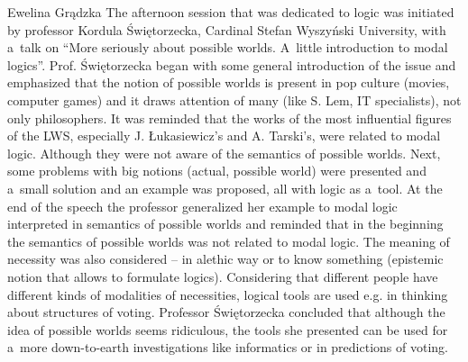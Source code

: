 \begin{editorialeng}{Ewelina Grądzka}
The afternoon session that was dedicated to logic was initiated by professor Kordula Świętorzecka, Cardinal Stefan Wyszyński University, with a~talk on “More seriously about possible worlds. A~little introduction to modal logics”. Prof. Świętorzecka began with some general introduction of the issue and emphasized that the notion of possible worlds is present in pop culture (movies, computer games) and it draws attention of many (like S. Lem, IT specialists), not only philosophers. It was reminded that the works of the most influential figures of the LWS, especially J. Łukasiewicz’s and A. Tarski’s, were related to modal logic. Although they were not aware of the semantics of possible worlds. Next, some problems with big notions (actual, possible world) were presented and a~small solution and an example was proposed, all with logic as a~tool. At the end of the speech the professor generalized her example to modal logic interpreted in semantics of possible worlds and reminded that in the beginning the semantics of possible worlds was not related to modal logic. The meaning of necessity was also considered – in alethic way or to know something (epistemic notion that allows to formulate logics). Considering that different people have different kinds of modalities of necessities, logical tools are used e.g. in thinking about structures of voting. Professor Świętorzecka concluded that although the idea of possible worlds seems ridiculous, the tools she presented can be used for a~more down-to-earth investigations like informatics or in predictions of voting.


\end{editorialeng}
